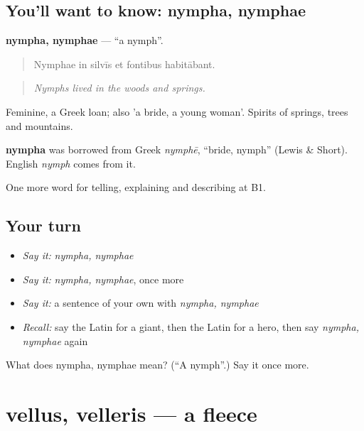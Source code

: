 \subsection*{You'll want to know: nympha, nymphae}
\textbf{nympha, nymphae} — \textquotedblleft{}a nymph\textquotedblright{}.

\begin{quote}
Nymphae in silvīs et fontibus habitābant.
\end{quote}

\begin{quote}
\emph{Nymphs lived in the woods and springs.}
\end{quote}

Feminine, a Greek loan; also 'a bride, a young woman'. Spirits of springs, trees and mountains.

\begin{cousinweb}
\textbf{nympha} was borrowed from Greek \emph{nymphē}, \textquotedblleft{}bride, nymph\textquotedblright{} (Lewis \& Short). English \emph{nymph} comes from it.
\end{cousinweb}

\begin{grammarlens}[title={What you've built}]
One more word for telling, explaining and describing at B1.
\end{grammarlens}

\subsection*{Your turn}
\begin{itemize}
\raggedright
  \item \emph{Say it:} \emph{nympha, nymphae}
  \item \emph{Say it:} \emph{nympha, nymphae}, once more
  \item \emph{Say it:} a sentence of your own with \emph{nympha, nymphae}
  \item \emph{Recall:} say the Latin for a giant, then the Latin for a hero, then say \emph{nympha, nymphae} again
\end{itemize}

\begin{tcolorbox}[breakable,colback=teal!4,colframe=teal!35!black,title={Before you move on}]
What does nympha, nymphae mean? (\textquotedblleft{}A nymph\textquotedblright{}.) Say it once more.
\end{tcolorbox}
\section[vellus, velleris]{vellus, velleris — a fleece}

